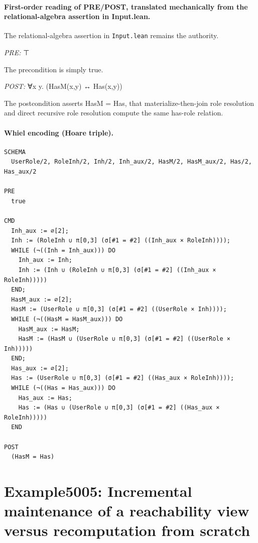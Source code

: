 \documentclass[10pt]{article}
\begin{document}
\paragraph{First-order reading of PRE/POST, translated mechanically from the relational-algebra assertion in Input.lean.} The relational-algebra assertion in \texttt{Input.lean} remains the authority.

\textit{PRE:} ⊤\par The precondition is simply true.

\textit{POST:} ∀x y. (HasM(x,y) ↔ Has(x,y))\par The postcondition asserts HasM = Has, that materialize-then-join role resolution and direct recursive role resolution compute the same has-role relation.

\paragraph{Whiel encoding (Hoare triple).}

\begin{Verbatim}[fontsize=\scriptsize,breaklines=true,breakanywhere=true,frame=single,framesep=1.5mm]
SCHEMA
  UserRole/2, RoleInh/2, Inh/2, Inh_aux/2, HasM/2, HasM_aux/2, Has/2, Has_aux/2

PRE
  true 

CMD
  Inh_aux := ∅[2];
  Inh := (RoleInh ∪ π[0,3] (σ[#1 = #2] ((Inh_aux × RoleInh))));
  WHILE (¬((Inh = Inh_aux))) DO
    Inh_aux := Inh;
    Inh := (Inh ∪ (RoleInh ∪ π[0,3] (σ[#1 = #2] ((Inh_aux × RoleInh)))))
  END;
  HasM_aux := ∅[2];
  HasM := (UserRole ∪ π[0,3] (σ[#1 = #2] ((UserRole × Inh))));
  WHILE (¬((HasM = HasM_aux))) DO
    HasM_aux := HasM;
    HasM := (HasM ∪ (UserRole ∪ π[0,3] (σ[#1 = #2] ((UserRole × Inh)))))
  END;
  Has_aux := ∅[2];
  Has := (UserRole ∪ π[0,3] (σ[#1 = #2] ((Has_aux × RoleInh))));
  WHILE (¬((Has = Has_aux))) DO
    Has_aux := Has;
    Has := (Has ∪ (UserRole ∪ π[0,3] (σ[#1 = #2] ((Has_aux × RoleInh)))))
  END

POST
  (HasM = Has)
\end{Verbatim}

\Needspace{0.45\textheight}

\section{Example5005: Incremental maintenance of a reachability view versus recomputation from scratch}\label{case:Example5005}
\end{document}
